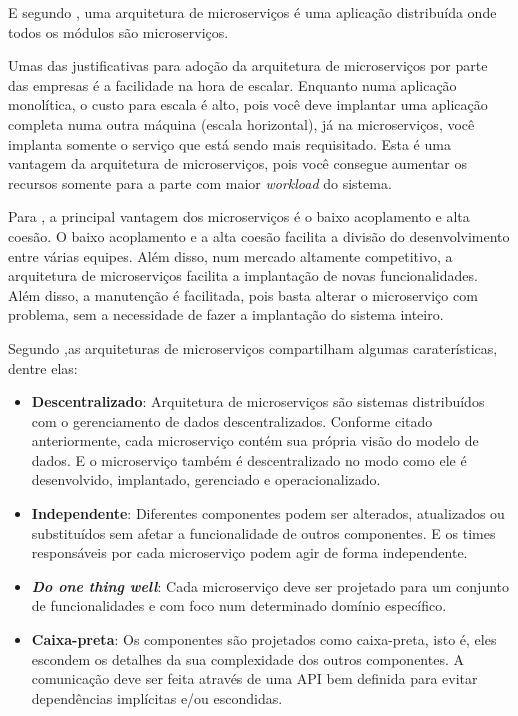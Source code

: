 \documentclass[12pt]{article}
\theoremstyle{plain}
\begin{document}
E segundo \cite{Dragoni2017}, uma arquitetura de microserviços é uma aplicação distribuída onde todos os módulos são microserviços.

Umas das justificativas para adoção da arquitetura de microserviços por parte das empresas é a facilidade na hora de escalar. Enquanto numa aplicação monolítica, o custo para escala é alto, pois você deve implantar uma aplicação completa numa outra máquina (escala horizontal), já na microserviços, você implanta somente o serviço que está sendo mais requisitado. Esta é uma vantagem da arquitetura de microserviços, pois você consegue aumentar os recursos somente para a parte com maior \textit{workload} do sistema. 

Para \cite{wolf:2018}, a principal vantagem dos microserviços é o baixo acoplamento e alta coesão. O baixo acoplamento e a alta coesão facilita a divisão do desenvolvimento entre várias equipes. Além disso, num mercado altamente competitivo, a arquitetura de microserviços facilita a implantação de novas funcionalidades. Além disso, a manutenção é facilitada, pois basta alterar o microserviço com problema, sem a necessidade de fazer a implantação do sistema inteiro.

Segundo \cite{jung:2017},as arquiteturas de microserviços compartilham algumas caraterísticas, dentre elas:

\begin{itemize}
    \item \textbf{Descentralizado}: Arquitetura de microserviços são sistemas distribuídos com o gerenciamento de dados descentralizados. Conforme citado anteriormente, cada microserviço contém sua própria visão do modelo de dados. E o microserviço também é descentralizado no modo como ele é desenvolvido, implantado, gerenciado e operacionalizado.
    \item \textbf{Independente}: Diferentes componentes podem ser alterados, atualizados ou substituídos sem afetar a funcionalidade de outros componentes. E os times responsáveis por cada microserviço podem agir de forma independente.
    \item \textbf{\textit{Do one thing well}}: Cada microserviço deve ser projetado para um conjunto de funcionalidades e com foco num determinado domínio específico.
    \item \textbf{Caixa-preta}: Os componentes são projetados como caixa-preta, isto é, eles escondem os detalhes da sua complexidade dos outros componentes. A comunicação deve ser feita através de uma API bem definida para evitar dependências implícitas e/ou escondidas.
\end{itemize}
\end{document}

